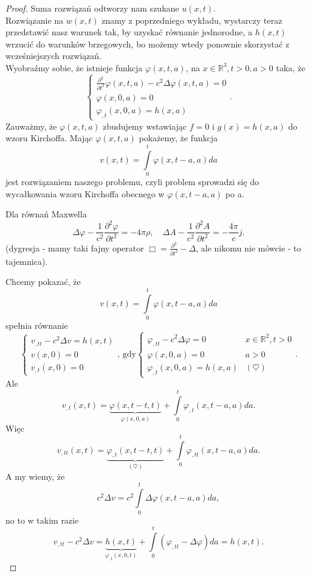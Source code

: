 \documentclass[../main.tex]{subfiles}
\begin{document}
\begin{proof}
Suma rozwiązań odtworzy nam szukane $u(x,t)$. \\
Rozwiązanie na $w(x,t)$ znamy z poprzedniego wykładu, wystarczy teraz przedstawić nasz warunek tak, by uzyskać równanie jednorodne, a $h(x,t)$ wrzucić do warunków brzegowych, bo możemy wtedy ponownie skorzystać z wcześniejszych rozwiązań.\\
		Wyobraźmy sobie, że istnieje funkcja $\varphi(x,t,a)$, na $x\in \mathbb{R}^3, t>0, a>0$ taka, że
		\[
		\begin{cases}
				\frac{\partial ^2}{\partial t^2} \varphi(x,t,a) - c^2 \Delta \varphi(x,t,a) = 0\\
				\varphi(x,0,a) = 0\\
				\varphi_{,t}(x,0,a) = h(x,a)
		\end{cases}
		.\]
		Zauważmy, że $\varphi(x,t,a)$ zbudujemy wstawiając $f = 0$ i $g(x) = h(x,a)$ do wzoru Kirchoffa. Mając $\varphi(x,t,a)$ pokażemy, że funkcja
		\[
				v(x,t) = \int\limits_0^t \varphi(x,t-a,a)da
		\]
		jest rozwiązaniem naszego problemu, czyli problem sprowadzi się do wycałkowania wzoru Kirchoffa obecnego w $\varphi(x,t-a,a)$ po a.

		\begin{przyklad}
				Dla równań Maxwella
				\[
				\Delta \varphi - \frac{1}{c^2} \frac{\partial ^2 \varphi}{\partial t^2} = -4\pi \rho,\quad \Delta A - \frac{1}{c^2}\frac{\partial ^2 A}{\partial t^2} = -\frac{4\pi}{c}j
				.\]
				(dygresja - mamy taki fajny operator $\Box = \frac{\partial ^2}{\partial t^2} - \Delta$, ale nikomu nie mówcie - to tajemnica).
		\end{przyklad}
		Chcemy pokazać, że
		\[
				v(x,t) = \int\limits_0^t \varphi(x,t-a,a)da
		\]
		spełnia równanie
		\[
		\begin{cases}
				v_{,t t}- c^2 \Delta v = h(x,t)\\
				v(x,0) = 0\\
				v_{,t}(x,0) = 0
		\end{cases}
		\text{, gdy}
		\begin{cases}
				\varphi_{,t t} - c^2 \Delta \varphi = 0 & x\in \mathbb{R}^2, t>0\\
				\varphi(x,0,a) = 0 & a > 0\\
				\varphi_{,t}(x,0,a) = h(x,a) &(\heartsuit)
		\end{cases}
		.\]
		Ale
		\[
				v_{,t}(x,t) = \underbrace{\varphi(x,t-t,t)}_{\varphi(x,0,a)}+ \int\limits_0^t \varphi_{,t}(x,t-a,a)da
		.\]
		Więc
		\[
				v_{,t t}(x,t) = \underbrace{\varphi_{,t}(x,t-t,t)}_{(\heartsuit)} + \int\limits_0^t \varphi_{,t t}(x, t-a, a)da
		.\]
		A my wiemy, że
		\[
				c^2 \Delta v = c^2 \int\limits_0^t \Delta \varphi(x,t-a,a)da
		,\]
		no to w takim razie
		\[
				v_{,t t} - c^2 \Delta v = \underbrace{h(x,t)}_{\varphi_{,t}(x,0,t)}+ \int\limits_{0}^{t}(\varphi_{,t t}-\Delta \varphi)da = h(x,t)
		.\]
\end{proof}
\end{document}
